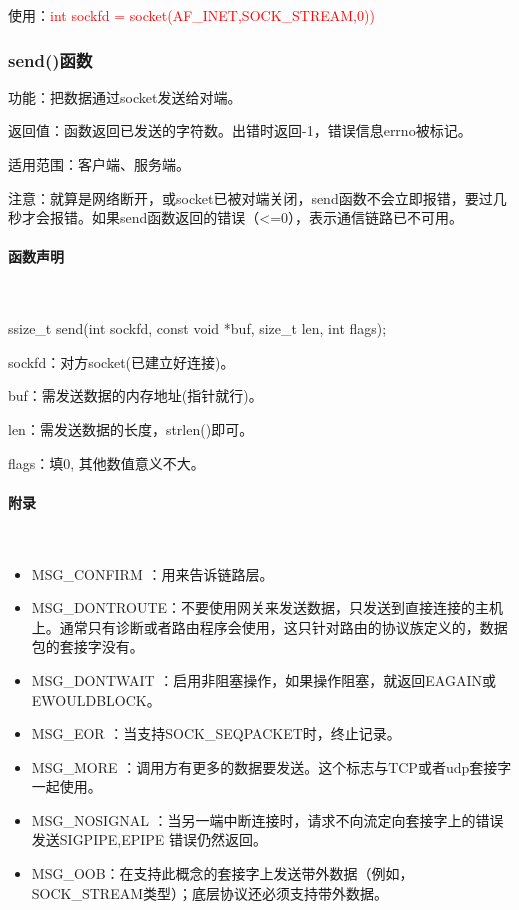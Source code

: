 \documentclass[UTF8]{article}%
\begin{document}
使用：\textcolor{red}{int sockfd = socket(AF\_INET,SOCK\_STREAM,0))}

\subsubsection{send()函数}

功能：把数据通过socket发送给对端。

返回值：函数返回已发送的字符数。出错时返回-1，错误信息errno被标记。

适用范围：客户端、服务端。

注意：就算是网络断开，或socket已被对端关闭，send函数不会立即报错，要过几秒才会报错。如果send函数返回的错误（<=0），表示通信链路已不可用。

\paragraph{函数声明}~{}

ssize\_t send(int sockfd, const void *buf, size\_t len, int flags);

sockfd：对方socket(已建立好连接)。

buf：需发送数据的内存地址(指针就行)。

len：需发送数据的长度，strlen()即可。

flags：填0, 其他数值意义不大。

\paragraph{附录}~{}

\begin{itemize}
    \item MSG\_CONFIRM ：用来告诉链路层。
    \item MSG\_DONTROUTE：不要使用网关来发送数据，只发送到直接连接的主机上。通常只有诊断或者路由程序会使用，这只针对路由的协议族定义的，数据包的套接字没有。
    \item MSG\_DONTWAIT ：启用非阻塞操作，如果操作阻塞，就返回EAGAIN或EWOULDBLOCK。
    \item MSG\_EOR ：当支持SOCK\_SEQPACKET时，终止记录。
    \item MSG\_MORE ：调用方有更多的数据要发送。这个标志与TCP或者udp套接字一起使用。
    \item MSG\_NOSIGNAL ：当另一端中断连接时，请求不向流定向套接字上的错误发送SIGPIPE,EPIPE 错误仍然返回。
    \item MSG\_OOB：在支持此概念的套接字上发送带外数据（例如，SOCK\_STREAM类型）；底层协议还必须支持带外数据。
\end{itemize}
\end{document}
